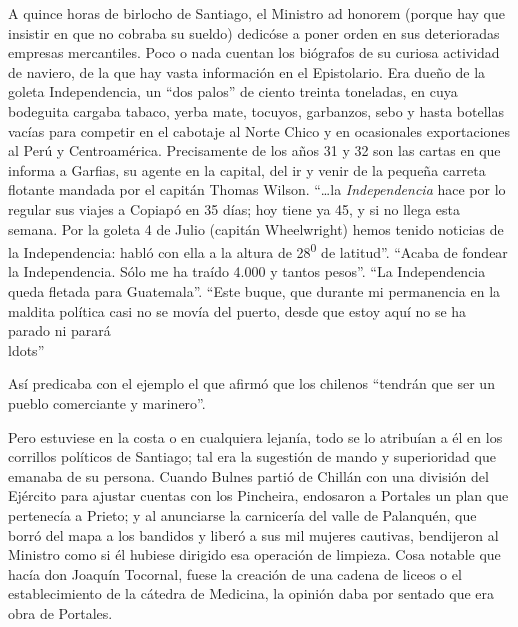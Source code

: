 \documentclass[10pt,twoside,openright]{memoir}
\begin{document}
A quince horas de birlocho de Santiago, el Ministro ad honorem (porque
hay que insistir en que no cobraba su sueldo) dedicóse a poner orden en
sus deterioradas empresas mercantiles. Poco o nada cuentan los biógrafos
de su curiosa actividad de naviero, de la que hay vasta información en
el Epistolario. Era dueño de la goleta Independencia, un ``dos palos'' de
ciento treinta toneladas, en cuya bodeguita cargaba tabaco, yerba mate,
tocuyos, garbanzos, sebo y hasta botellas vacías para competir en el
cabotaje al Norte Chico y en ocasionales exportaciones al Perú y
Centroamérica. Precisamente de los años 31 y 32 son las cartas en que
informa a Garfias, su agente en la capital, del ir y venir de la pequeña
carreta flotante mandada por el capitán Thomas Wilson. ``\ldots{}la
\emph{Independencia} hace por lo regular sus viajes a Copiapó en 35
días; hoy tiene ya 45, y si no llega esta semana. Por la goleta 4 de
Julio (capitán Wheelwright) hemos tenido noticias de la Independencia:
habló con ella a la altura de 28\textsuperscript{0} de latitud''. ``Acaba
de fondear la Independencia. Sólo me ha traído 4.000 y tantos pesos''.
``La Independencia queda fletada para Guatemala''. ``Este buque, que
durante mi permanencia en la maldita política casi no se movía del
puerto, desde que estoy aquí no se ha parado ni parará\\ldots''

Así predicaba con el ejemplo el que afirmó que los chilenos ``tendrán
que ser un pueblo comerciante y marinero''.

Pero estuviese en la costa o en cualquiera lejanía, todo se lo atribuían
a él en los corrillos políticos de Santiago; tal era la sugestión de
mando y superioridad que emanaba de su persona. Cuando Bulnes partió de
Chillán con una división del Ejército para ajustar cuentas con los
Pincheira, endosaron a Portales un plan que pertenecía a Prieto; y al
anunciarse la carnicería del valle de Palanquén, que borró del mapa a
los bandidos y liberó a sus mil mujeres cautivas, bendijeron al Ministro
como si él hubiese dirigido esa operación de limpieza. Cosa notable que
hacía don Joaquín Tocornal, fuese la creación de una cadena de liceos o
el establecimiento de la cátedra de Medicina, la opinión daba por
sentado que era obra de Portales.
\end{document}
